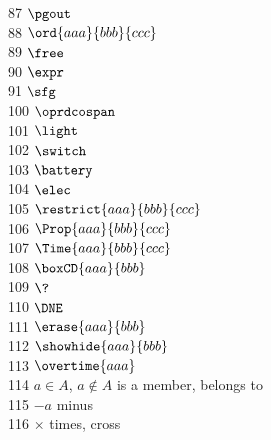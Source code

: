 \documentclass[11pt, book]{memoir}
\begin{document}
\begin{multicols}{3}
 87 $\pgout$ \\
 88 $\ord{aaa}{bbb}{ccc}$ \\
 89 $\free$ \\
 90 $\expr$ \\
 91 $\sfg$ \\
100 $\oprdcospan$ \\
101 $\light$ \\
102 $\switch$ \\
103 $\battery$ \\
104 $\elec$ \\
105 $\restrict{aaa}{bbb}{ccc}$ \\
106 $\Prop{aaa}{bbb}{ccc}$ \\
107 $\Time{aaa}{bbb}{ccc}$ \\
108 $\boxCD{aaa}{bbb}$ \\
109 $\?$ \\
110 $\DNE$ \\
111 $\erase{aaa}{bbb}$ \\
112 $\showhide{aaa}{bbb}$ \\
113 $\overtime{aaa}$ \\
114 $a \in A$, $a \notin A$ is a member, belongs to \\
115 $\minus a$ minus \\
116 $\times $ times, cross \\


\end{multicols}
\end{document}
